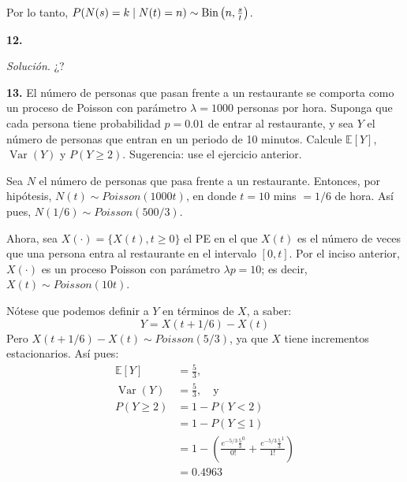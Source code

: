 \documentclass[12pt]{article}
\newcommand{\E}{\mathbb{E}}
\DeclareMathOperator{\Var}{Var}
\begin{document}
Por lo tanto, $ P(N(s) = k \mid N(t) = n) \sim \textnormal{Bin} \left(n, \frac{s}{t} \right)$.

\begin{tcolorbox}[colback=blue!5!white, colframe=blue!5!white, arc=0mm, boxrule=0pt]
    \textbf{12.} 
\end{tcolorbox} 

\textit{Solución}. ¿?

\begin{tcolorbox}[colback=blue!5!white, colframe=blue!5!white, arc=0mm, boxrule=0pt]
    \textbf{13.} El número de personas que pasan frente a un restaurante se comporta  como un proceso de Poisson con parámetro $\lambda = 1000$ personas por hora. Suponga que cada persona tiene probabilidad $p = 0.01$ de entrar al restaurante, y sea $Y$ el número de personas que entran en un periodo de 10 minutos. Calcule $\E[Y]$, $\Var(Y)$ y $P(Y \geq 2)$. Sugerencia: use el ejercicio anterior.

\end{tcolorbox} 

Sea $N$ el número de personas que pasa frente a un restaurante. Entonces, por hipótesis, $N(t) \sim Poisson(1000t)$, en donde $t = 10$ mins $ = 1/6$ de hora. Así pues, $N(1/6) \sim Poisson(500/3)$. 

Ahora, sea $X(\cdot) = \{ X(t), t \geq 0 \}$ el PE en el que $X(t)$ es el número de veces que una persona entra al restaurante en el intervalo $[0, t]$. Por el inciso anterior, $X(\cdot)$ es un proceso Poisson con parámetro $\lambda p = 10$; es decir, $ X(t) \sim Poisson(10t)$.

Nótese que podemos definir a $Y$ en términos de $X$, a saber:
\[ Y = X(t+1/6) - X(t) \]
Pero $X(t+1/6) - X(t) \sim Poisson(5/3)$, ya que $X$ tiene incrementos estacionarios. Así pues:
\begin{align*}
    \E[Y] &= \frac{5}{3}, \\
    \Var(Y) &= \frac{5}{3}, \quad \textrm{y}\\
    P(Y \geq 2) &= 1 - P(Y < 2) \\
    &= 1 - P(Y \leq 1) \\
    &= 1 - \left( \frac{e^{-5/3} \frac{5}{3}^{0} }{0!} + \frac{e^{-5/3} \frac{5}{3}^{1} }{1!}\right)\\
    &= 0.4963
\end{align*}
\end{document}
